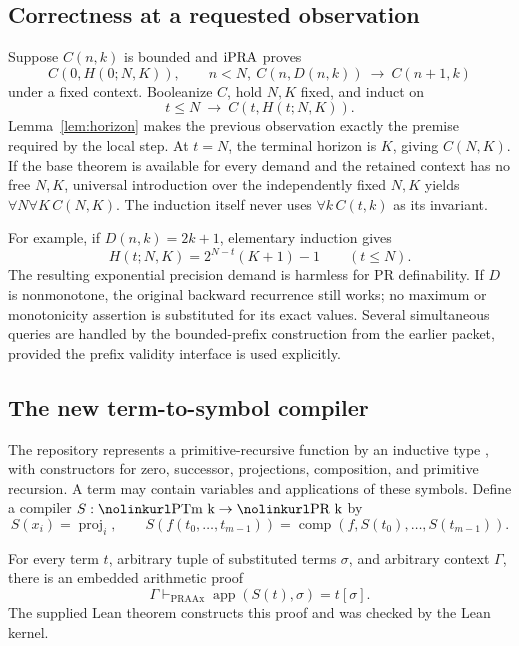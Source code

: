 \subsection{Correctness at a requested observation}

Suppose \(C(n,k)\) is bounded and \(\mathrm{iPRA}\) proves
\[
 C(0,H(0;N,K)),\qquad
 n<N,\ C(n,D(n,k))\ \longrightarrow\ C(n+1,k)
\]
under a fixed context. Booleanize \(C\), hold \(N,K\) fixed, and
induct on
\[
             t\le N\ \longrightarrow\ C(t,H(t;N,K)).
\]
Lemma~\ref{lem:horizon} makes the previous observation exactly the
premise required by the local step. At \(t=N\), the terminal horizon
is \(K\), giving \(C(N,K)\). If the base theorem is available for
every demand and the retained context has no free \(N,K\), universal introduction over the independently fixed
\(N,K\) yields \(\forall N\forall K\,C(N,K)\).
The induction itself never uses \(\forall k\,C(t,k)\) as its invariant.

For example, if \(D(n,k)=2k+1\), elementary induction gives
\[
            H(t;N,K)=2^{N-t}(K+1)-1\qquad(t\le N).
\]
The resulting exponential precision demand is harmless for PR
definability. If \(D\) is nonmonotone, the original backward recurrence
still works; no maximum or monotonicity assertion is substituted for
its exact values. Several simultaneous queries are handled by the
bounded-prefix construction from the earlier packet, provided the
prefix validity interface is used explicitly.

\subsection{The new term-to-symbol compiler}

The repository represents a primitive-recursive function by an inductive
type , with constructors for zero, successor, projections,
composition, and primitive recursion. A term  may contain
variables and applications of these symbols. Define a compiler
\(S:\code{PTm k}\to\code{PR k}\) by
\[
 S(x_i)=\operatorname{proj}_i,
 \qquad
 S(f(t_0,\ldots,t_{m-1}))
   =\operatorname{comp}(f,S(t_0),\ldots,S(t_{m-1})).
\]

\begin{theorem}
\label{thm:term-compile}
For every term \(t\), arbitrary tuple of substituted terms \(\sigma\),
and arbitrary context \(\Gamma\), there is an embedded arithmetic proof
\[
 \Gamma\vdash_{\mathrm{PRAAx}}
      \operatorname{app}(S(t),\sigma)=t[\sigma].
\]
The supplied Lean theorem  constructs
this proof and was checked by the Lean kernel.
\end{theorem}

